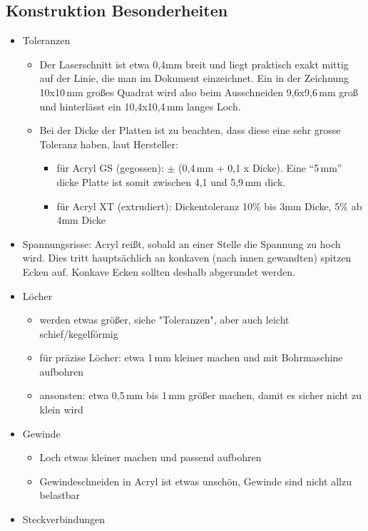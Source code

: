 \documentclass{\basedir/fablab-document}
\begin{document}
	\subsection{Konstruktion Besonderheiten}
\begin{itemize}
  \item Toleranzen
	\begin{itemize}
	  \item Der Laserschnitt ist etwa 0,4mm breit und liegt praktisch exakt mittig auf der Linie,
		  die man im Dokument einzeichnet. Ein in der Zeichnung 10x10\,mm großes Quadrat wird also beim
		  Ausschneiden 9,6x9,6\,mm groß und hinterlässt ein 10,4x10,4\,mm langes Loch.
      \item Bei der Dicke der Platten ist zu beachten, dass diese eine sehr grosse Toleranz haben, laut Hersteller:
		\begin{itemize}
			\item für Acryl GS (gegossen): $\pm$ (0,4\,mm + 0,1 x Dicke). Eine \enquote{5\,mm} dicke Platte ist somit zwischen 4,1 und 5,9\,mm dick.
			\item für Acryl XT (extrudiert): Dickentoleranz 10\% bis 3mm Dicke, 5\% ab 4mm Dicke
		\end{itemize}
	\end{itemize}
  \item Spannungsrisse: Acryl reißt, sobald an einer Stelle die Spannung zu hoch wird. Dies tritt hauptsächlich an konkaven (nach innen gewandten) spitzen Ecken auf. Konkave Ecken sollten deshalb abgerundet werden.
  \item Löcher
	\begin{itemize}
		\item werden etwas größer, siehe "Toleranzen", aber auch leicht schief/kegelförmig
		\item für präzise Löcher: etwa 1\,mm kleiner machen und mit Bohrmaschine aufbohren
		\item ansonsten: etwa 0,5\,mm bis 1\,mm größer machen, damit es sicher nicht zu klein wird
	\end{itemize}
  \item Gewinde
	\begin{itemize}
		\item Loch etwas kleiner machen und passend aufbohren
		\item Gewindeschneiden in Acryl ist etwas unschön, Gewinde sind nicht allzu belastbar
	\end{itemize}
  \item Steckverbindungen
	\begin{itemize}

\end{itemize}
\end{itemize}
\end{document}
